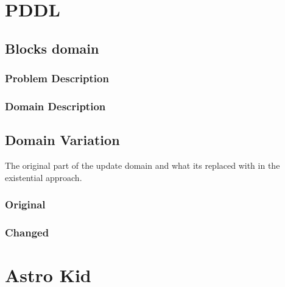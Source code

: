 
\lstset{tabsize=2}
\chapter{PDDL}

\section{Blocks domain}\label{blocks}
\subsection{Problem Description}\label{blocks-prob}

\subsection{Domain Description}\label{blocks-domain}



\section{Domain Variation}\label{Domain_Variation}
The original part of the update domain and what its replaced with in the existential approach.
\subsection{Original}\label{domain}

\subsection{Changed}\label{domain2}


\chapter{Astro Kid}
